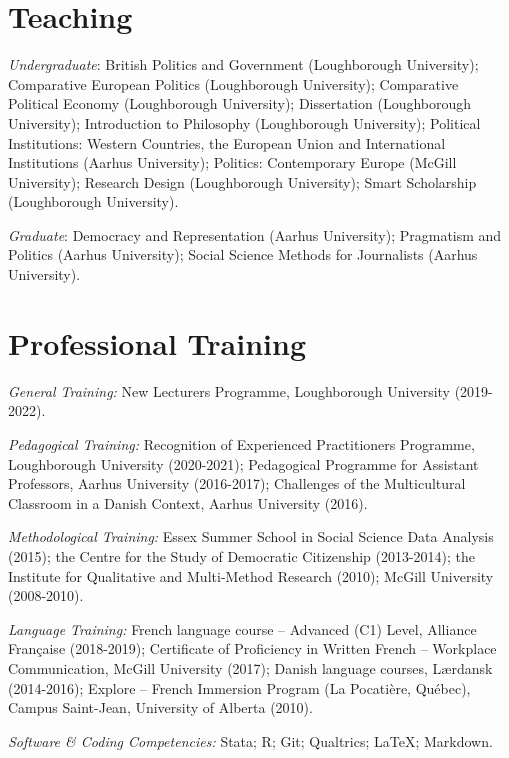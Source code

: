 \documentclass[letterpaper,fontsize=10.5pt]{scrartcl}
\begin{document}
\section{Teaching}
{}\textit{Undergraduate}: British Politics and Government (Loughborough University); Comparative European Politics (Loughborough University); Comparative Political Economy (Loughborough University); Dissertation (Loughborough University); Introduction to Philosophy (Loughborough University); Political Institutions: Western Countries, the European Union and International Institutions (Aarhus University); Politics: Contemporary Europe (McGill University); Research Design (Loughborough University); Smart Scholarship (Loughborough University).\\
\hfill \break
{}
{}\textit{Graduate}: Democracy and Representation (Aarhus University); Pragmatism and Politics (Aarhus University); Social Science Methods for Journalists (Aarhus University).

\section{Professional Training}
{}\textit{General Training:} New Lecturers Programme, Loughborough University (2019-2022).\\
\hfill \break
{}
{}\textit{Pedagogical Training:} Recognition of Experienced Practitioners Programme, Loughborough University (2020-2021); Pedagogical Programme for Assistant Professors, Aarhus University (2016-2017); Challenges of the Multicultural Classroom in a Danish Context, Aarhus University (2016).\\
\hfill \break
{}
{}\textit{Methodological Training:} Essex Summer School in Social Science Data Analysis (2015); the Centre for the Study of Democratic Citizenship (2013-2014); the Institute for Qualitative and Multi-Method Research (2010); McGill University (2008-2010).\\
\hfill \break
{}
{}\textit{Language Training:} French language course – Advanced (C1) Level, Alliance Française (2018-2019); Certificate of Proficiency in Written French – Workplace Communication, McGill University (2017); Danish language courses, Lærdansk (2014-2016); Explore – French Immersion Program (La Pocatière, Québec), Campus Saint-Jean, University of Alberta (2010).\\
\hfill \break
{}
{}\textit{Software \& Coding Competencies:} Stata; R; Git; Qualtrics; \LaTeX ; Markdown.
\end{document}
